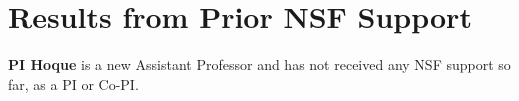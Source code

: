 
\vspace*{-0.5em}
\section{Results from Prior NSF Support}
\label{sec:prior}

\noindent
\textbf{PI Hoque} is a new Assistant Professor and has not received any NSF support so far, as a PI or Co-PI.


